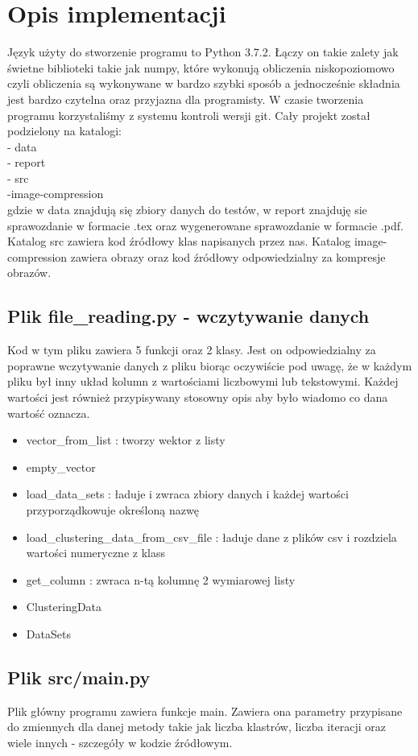 \documentclass{classrep}
\begin{document}
\section{Opis implementacji}
{Język użyty do stworzenie programu to Python 3.7.2. Łączy on takie zalety jak świetne biblioteki takie jak numpy,
które wykonują obliczenia niskopoziomowo czyli obliczenia są wykonywane w bardzo szybki sposób a jednocześnie składnia
jest bardzo czytelna oraz przyjazna dla programisty. W czasie tworzenia programu korzystaliśmy z systemu kontroli
wersji git. Cały projekt został podzielony na katalogi:\\
- data\\
- report\\
- src\\
-image-compression\\
gdzie w data znajdują się zbiory danych do testów, w report znajduję sie sprawozdanie w formacie .tex oraz wygenerowane
sprawozdanie w formacie .pdf. Katalog src zawiera kod źródłowy klas napisanych przez nas. Katalog image-compression zawiera obrazy oraz kod źródłowy odpowiedzialny za kompresje obrazów.
\subsection{Plik file\_reading.py - wczytywanie danych}
{
Kod w tym pliku zawiera 5 funkcji oraz 2 klasy. Jest on odpowiedzialny za poprawne wczytywanie danych z pliku biorąc
oczywiście pod uwagę, że w każdym pliku był inny układ kolumn z wartościami liczbowymi lub tekstowymi. Każdej wartości
jest również przypisywany stosowny opis aby było wiadomo co dana wartość oznacza.
\begin{itemize}
\item vector\_from\_list : tworzy wektor z listy
\item empty\_vector
\item load\_data\_sets : ładuje i zwraca zbiory danych i każdej wartości przyporządkowuje określoną nazwę
\item load\_clustering\_data\_from\_csv\_file : ładuje dane z plików csv i rozdziela wartości numeryczne z klass
\item get\_column : zwraca n-tą kolumnę 2 wymiarowej listy
\item ClusteringData
\item DataSets
\end{itemize}
}
\subsection{Plik src/main.py}
{
Plik główny programu zawiera funkcje main. Zawiera ona parametry przypisane do zmiennych dla danej metody takie jak
liczba klastrów, liczba iteracji oraz wiele innych - szczegóły w kodzie źródłowym.
}
}
\end{document}

